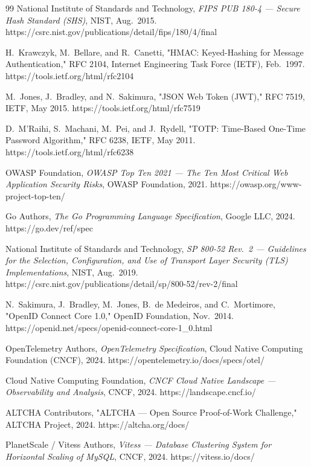 \documentclass[12pt,a4paper]{report}
\begin{document}
\begin{thebibliography}{99}
National Institute of Standards and Technology, \textit{FIPS PUB 180-4 --- Secure Hash Standard (SHS)}, NIST, Aug.\ 2015. https://csrc.nist.gov/publications/detail/fips/180/4/final

H.\ Krawczyk, M.\ Bellare, and R.\ Canetti, "HMAC: Keyed-Hashing for Message Authentication," RFC 2104, Internet Engineering Task Force (IETF), Feb.\ 1997. https://tools.ietf.org/html/rfc2104

M.\ Jones, J.\ Bradley, and N.\ Sakimura, "JSON Web Token (JWT)," RFC 7519, IETF, May 2015. https://tools.ietf.org/html/rfc7519

D.\ M'Raihi, S.\ Machani, M.\ Pei, and J.\ Rydell, "TOTP: Time-Based One-Time Password Algorithm," RFC 6238, IETF, May 2011. https://tools.ietf.org/html/rfc6238

OWASP Foundation, \textit{OWASP Top Ten 2021 --- The Ten Most Critical Web Application Security Risks}, OWASP Foundation, 2021. https://owasp.org/www-project-top-ten/


Go Authors, \textit{The Go Programming Language Specification}, Google LLC, 2024. https://go.dev/ref/spec

National Institute of Standards and Technology, \textit{SP 800-52 Rev.\ 2 --- Guidelines for the Selection, Configuration, and Use of Transport Layer Security (TLS) Implementations}, NIST, Aug.\ 2019. https://csrc.nist.gov/publications/detail/sp/800-52/rev-2/final

N.\ Sakimura, J.\ Bradley, M.\ Jones, B.\ de Medeiros, and C.\ Mortimore, "OpenID Connect Core 1.0," OpenID Foundation, Nov.\ 2014. https://openid.net/specs/openid-connect-core-1\_0.html

OpenTelemetry Authors, \textit{OpenTelemetry Specification}, Cloud Native Computing Foundation (CNCF), 2024. https://opentelemetry.io/docs/specs/otel/

Cloud Native Computing Foundation, \textit{CNCF Cloud Native Landscape --- Observability and Analysis}, CNCF, 2024. https://landscape.cncf.io/

ALTCHA Contributors, "ALTCHA --- Open Source Proof-of-Work Challenge," ALTCHA Project, 2024. https://altcha.org/docs/

PlanetScale / Vitess Authors, \textit{Vitess --- Database Clustering System for Horizontal Scaling of MySQL}, CNCF, 2024. https://vitess.io/docs/


\end{thebibliography}
\end{document}
